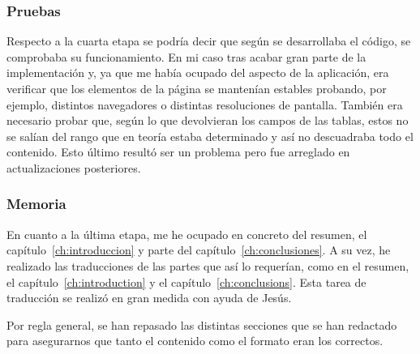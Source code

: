 \subsubsection{Pruebas}
Respecto a la cuarta etapa se podría decir que según se desarrollaba el código, se comprobaba su funcionamiento. En mi caso tras acabar gran parte de la implementación y, ya que me había ocupado del aspecto de la aplicación, era verificar que los elementos de la página se mantenían estables probando, por ejemplo, distintos navegadores o distintas resoluciones de pantalla. También era necesario probar que, según lo que devolvieran los campos de las tablas, estos no se salían del rango que en teoría estaba determinado y así no descuadraba todo el contenido. Esto último resultó ser un problema pero fue arreglado en actualizaciones posteriores.
\subsubsection{Memoria}
En cuanto a la última etapa, me he ocupado en concreto del resumen, el capítulo~\ref{ch:introduccion} y parte del capítulo~\ref{ch:conclusiones}. A su vez, he realizado las traducciones de las partes que así lo requerían, como en el resumen, el capítulo~\ref{ch:introduction} y el capítulo~\ref{ch:conclusions}. Esta tarea de traducción se realizó en gran medida con ayuda de Jesús.\par
Por regla general, se han repasado las distintas secciones que se han redactado para asegurarnos que tanto el contenido como el formato eran los correctos.

\noindent
